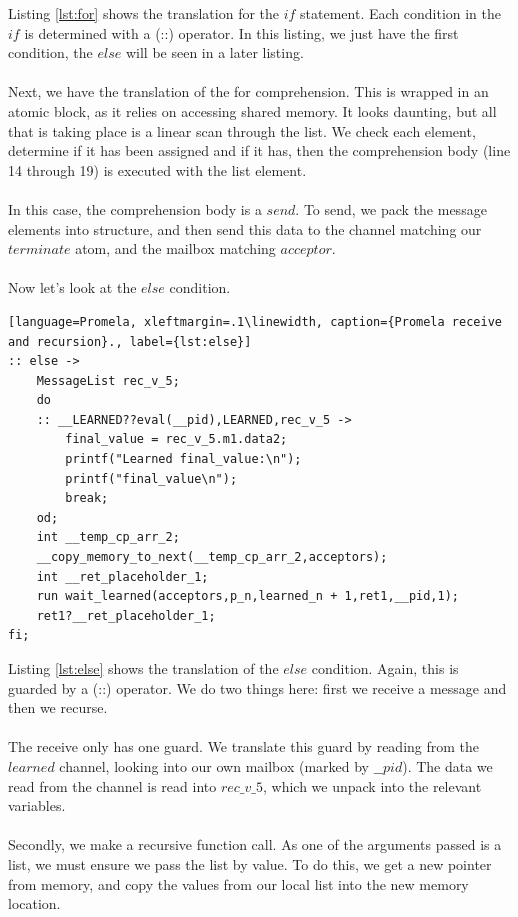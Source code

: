 Listing \ref{lst:for} shows the translation for the $if$ statement. Each condition in the $if$ is determined with a (::) operator. In this listing, we just have the first condition, the $else$ will be seen in a later listing. 
\\ \\
Next, we have the translation of the for comprehension. This is wrapped in an atomic block, as it relies on accessing shared memory. It looks daunting, but all that is taking place is a linear scan through the list. We check each element, determine if it has been assigned and if it has, then the comprehension body (line 14 through 19) is executed with the list element.
\\ \\
In this case, the comprehension body is a $send$. To send, we pack the message elements into structure, and then send this data to the channel matching our $terminate$ atom, and the mailbox matching $acceptor$.
\\ \\
Now let's look at the $else$ condition.
\begin{lstlisting}[language=Promela, xleftmargin=.1\linewidth, caption={Promela receive and recursion}., label={lst:else}]
:: else -> 
    MessageList rec_v_5;
    do
    :: __LEARNED??eval(__pid),LEARNED,rec_v_5 -> 
        final_value = rec_v_5.m1.data2;
        printf("Learned final_value:\n");
        printf("final_value\n");
        break;
    od;
    int __temp_cp_arr_2;
    __copy_memory_to_next(__temp_cp_arr_2,acceptors);
    int __ret_placeholder_1;
    run wait_learned(acceptors,p_n,learned_n + 1,ret1,__pid,1);
    ret1?__ret_placeholder_1;
fi;
\end{lstlisting}
Listing \ref{lst:else} shows the translation of the $else$ condition. Again, this is guarded by a (::) operator. We do two things here: first we receive a message and then we recurse.
\\ \\
The receive only has one guard. We translate this guard by reading from the $learned$ channel, looking into our own mailbox (marked by $\_\_pid$). The data we read from the channel is read into $rec\_v\_5$, which we unpack into the relevant variables.
\\ \\
Secondly, we make a recursive function call. As one of the arguments passed is a list, we must ensure we pass the list by value. To do this, we get a new pointer from memory, and copy the values from our local list into the new memory location.
